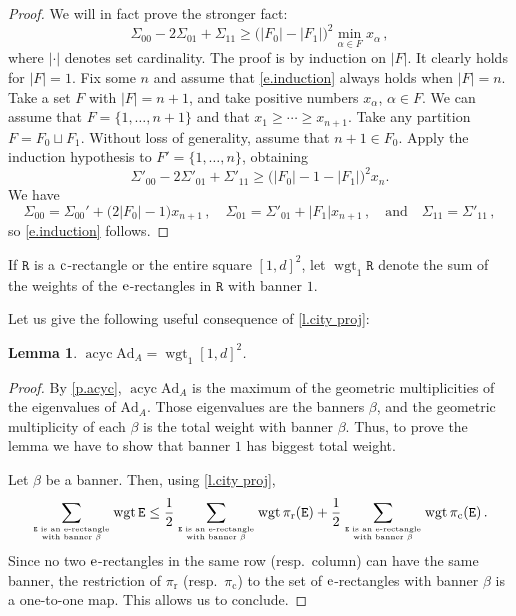 \documentclass[10pt, a4paper]{amsart}
\theoremstyle{plain}
\newtheorem{lemma}{Lemma}[section]
\theoremstyle{definition}
\theoremstyle{remark}
\theoremstyle{note}
\numberwithin{equation}{section}
\begin{document}
\begin{proof}
We will in fact prove the stronger fact:
\begin{equation}\label{e.induction}
\Sigma_{00} - 2\Sigma_{01} + \Sigma_{11} \ge \big(|F_0| -|F_1|\big)^2 \min_{\alpha \in F} x_\alpha \, ,
\end{equation}
where $|\mathord{\cdot}|$ denotes set cardinality.
The proof is by induction on $|F|$.
It clearly holds for $|F|=1$.
Fix some $n$ and assume that \eqref{e.induction} always holds when $|F| = n$.
Take a set $F$ with $|F|=n+1$, and take positive numbers $x_\alpha$, $\alpha \in F$.
We can assume that $F=\{1, \ldots, n+1\}$ and that $x_1 \ge \cdots \ge x_{n+1}$.
Take any partition $F = F_0 \sqcup F_1$.
Without loss of generality, assume that $n+1 \in F_0$.
Apply the induction hypothesis to $F'=\{1, \ldots, n\}$, obtaining
$$
\Sigma'_{00} - 2\Sigma'_{01} + \Sigma'_{11}  \ge  \big(|F_0| - 1 - |F_1|)^2 x_n.
$$
We have 
$$
\Sigma_{00} = \Sigma_{00}' + \big( 2|F_0| -1 \big) x_{n+1} \, ,
\quad 
\Sigma_{01} = \Sigma'_{01} + |F_1| x_{n+1} \, ,
\quad \text{and} \quad
\Sigma_{11} = \Sigma'_{11} \, ,
$$
so \eqref{e.induction} follows.
\end{proof}

If ${\mathtt{R}}$ is a $\rm c$-rectangle or the entire square $[1,d]^2$, let $\operatorname{wgt}_1 {\mathtt{R}}$ denote 
the sum of the weights of the $\rm e$-rectangles in ${\mathtt{R}}$ with banner $1$.

Let us give the following useful consequence of \cref{l.city proj}:

\begin{lemma}\label{l.acyc and pop1}
$\operatorname{acyc} {\mathrm{Ad}}_A = \operatorname{wgt}_1 [1,d]^2$.
\end{lemma}

\begin{proof}
By \cref{p.acyc}, $\operatorname{acyc} {\mathrm{Ad}}_A$ 
is the maximum of the geometric multiplicities of the eigenvalues of ${\mathrm{Ad}}_A$.
Those eigenvalues are the banners $\beta$, and the geometric multiplicity of each $\beta$
is the total weight with banner $\beta$.
Thus, to prove the lemma we have to show that banner $1$ has biggest total weight.

Let $\beta$ be a banner.
Then, using \cref{l.city proj},
$$
\sum_{\text{${\mathtt{E}}$ is an $\rm e$-rectangle}\atop\text{with banner $\beta$}} \operatorname{wgt} {\mathtt{E}} 
\le \frac12 \sum_{\text{${\mathtt{E}}$ is an $\rm e$-rectangle}\atop\text{with banner $\beta$}} \operatorname{wgt} {\pi_\mathrm{r}}({\mathtt{E}})  
+   \frac12 \sum_{\text{${\mathtt{E}}$ is an $\rm e$-rectangle}\atop\text{with banner $\beta$}} \operatorname{wgt} {\pi_\mathrm{c}}({\mathtt{E}}) \, .
$$
Since no two $\rm e$-rectangles in the same row (resp.\ column) can have the same banner,
the restriction of ${\pi_\mathrm{r}}$ (resp.\ ${\pi_\mathrm{c}}$) to the set of $\rm e$-rectangles with banner $\beta$ is 
a one-to-one map. 
This allows us to conclude.
\end{proof}
\end{document}
